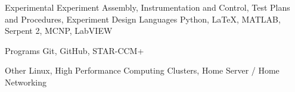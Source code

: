 
\begin{cvskills}
  \cvskill
    {Experimental}
    {Experiment Assembly, Instrumentation and Control, Test Plans and Procedures, Experiment Design}
  \cvskill
    {Languages} %
    {Python, \LaTeX, MATLAB, Serpent 2, MCNP, LabVIEW} %

  \cvskill
    {Programs} %
    {Git, GitHub, STAR-CCM+} %
    
  \cvskill
    {Other} %
    {Linux, High Performance Computing Clusters, Home Server / Home Networking} %
\end{cvskills}
